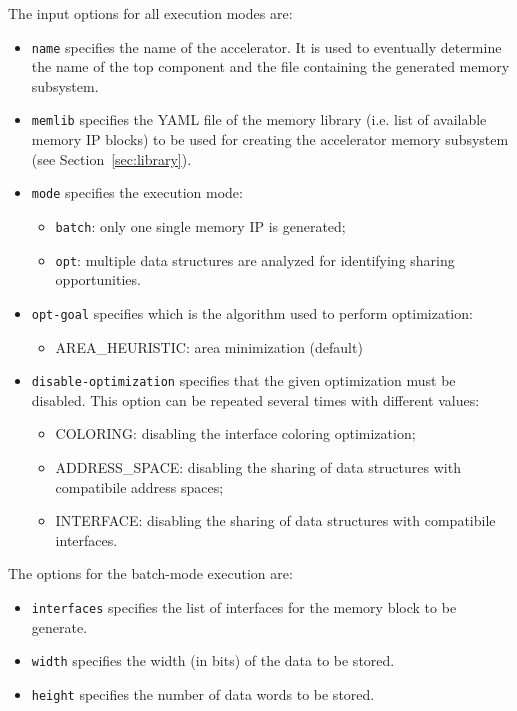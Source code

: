 \noindent The input options for all execution modes are:
\begin{itemize}
\item {\tt name} specifies the name of the accelerator. It is used to
  eventually determine the name of the top component and the file containing the generated
  memory subsystem.
\item {\tt memlib} specifies the YAML file of the memory library (i.e. list of
  available memory IP blocks) to be used for creating the accelerator memory
  subsystem (see Section~\ref{sec:library}).
\item {\tt mode} specifies the execution mode:
\begin{itemize}
\item {\tt batch}: only one single memory IP is generated;
\item {\tt opt}: multiple data structures are analyzed for identifying sharing opportunities.
\end{itemize}
\item {\tt opt-goal} specifies which is the algorithm used to perform optimization:
\begin{itemize}
\item AREA\_HEURISTIC: area minimization (default)
\end{itemize}
\item {\tt disable-optimization} specifies that the given optimization must be disabled. This option can be repeated several times with different values:
\begin{itemize}
\item COLORING: disabling the interface coloring optimization;
\item ADDRESS\_SPACE: disabling the sharing of data structures with compatibile address spaces;
\item INTERFACE: disabling the sharing of data structures with compatibile interfaces.
\end{itemize}
\end{itemize}

\noindent The options for the batch-mode execution are:
\begin{itemize}
\item {\tt interfaces} specifies the list of interfaces for the memory block to be generate.
\item {\tt width} specifies the width (in bits) of the data to be stored.
\item {\tt height} specifies the number of data words to be stored.
\end{itemize}

